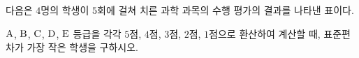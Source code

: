 다음은 $4$명의 학생이 $5$회에 걸쳐 치른 과학 과목의 수행 평가의 결과를 나타낸 표이다.\par\smallskip{\centering\par}\smallskip\noindent $\mathrm{A}$, $\mathrm{B}$, $\mathrm{C}$, $\mathrm{D}$, $\mathrm{E}$ 등급을 각각 $5$점, $4$점, $3$점, $2$점, $1$점으로 환산하여 계산할 때, 표준편차가 가장 작은 학생을 구하시오.
